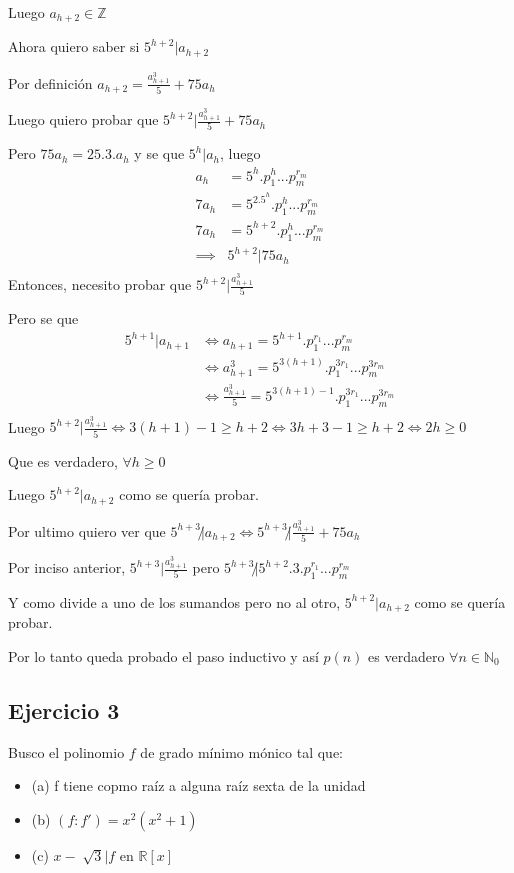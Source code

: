 Luego $ a_{h+2} \in \mathbb{Z} $

Ahora quiero saber si $ 5^{h+2} | a_{h+2} $

Por definición $ a_{h+2} = \frac{a_{h+1}^3}{5} + 75a_h $

Luego quiero probar que $ 5^{h+2} | \frac{a_{h+1}^3}{5} + 75a_h $

Pero $ 75a_h = 25.3.a_h $ y se que $ 5^h | a_h $, luego
\begin{align*}
    a_h &= 5^h.p_{1}^h...p_{m}^{r_{m}} \\
    7a_h &= 5^2.5^h.p_1^h...p_m^{r_m} \\
    7a_h &= 5^{h+2}.p_1^h...p_m^{r_m} \\
    \implies& 5^{h+2}|75a_h \\
\end{align*}
Entonces, necesito probar que $ 5^{h+2} | \frac{a_{h+1}^3}{5} $

Pero se que
\begin{align*}
    5^{h+1} | a_{h+1} &\iff a_{h+1} = 5^{h+1} . p_1^{r_1}...p_m^{r_m} \\
    &\iff a_{h+1}^3 = 5^{3(h+1)} . p_1^{3r_1}...p_m^{3r_m} \\
    &\iff \frac{a_{h+1}^3}{5} = 5^{3(h+1) - 1} . p_1^{3r_1}...p_m^{3r_m} \\
\end{align*}
Luego $ 5^{h+2} | \frac{a_{h+1}^3}{5} \iff 3(h+1) - 1 \geq h+2 \iff 3h+3-1 \geq h+2 \iff 2h \geq 0 $

Que es verdadero, $ \forall h \geq 0 $

Luego $ 5^{h+2} | a_{h+2} $ como se quería probar.

Por ultimo quiero ver que $ 5^{h+3} \not | a_{h+2} \iff 5^{h+3} \not | \frac{a_{h+1}^3}{5} + 75a_h $

Por inciso anterior, $ 5^{h+3} | \frac{a_{h+1}^3}{5} $ pero $ 5^{h+3} \not | 5^{h+2}.3.p_1^{r_1}...p_m^{r_m} $

Y como divide a uno de los sumandos pero no al otro, $ 5^{h+2} | a_{h+2} $ como se quería probar.

Por lo tanto queda probado el paso inductivo y así $ p(n) $ es verdadero $ \forall n \in \mathbb{N}_0 $

\subsection{Ejercicio 3}

Busco el polinomio $f$ de grado mínimo mónico tal que:
\begin{itemize}
    \item (a) f tiene copmo raíz a alguna raíz sexta de la unidad
    \item (b) $ (f:f') = x^2(x^2 + 1) $
    \item (c) $ x- \sqrt[]{3} | f $ en $ \mathbb{R}[x] $
\end{itemize}

